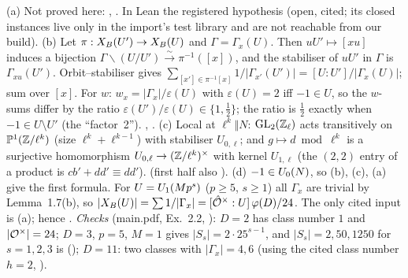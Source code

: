 \begin{outline}
(a) Not proved here: \stcited{} \cite[Thm.~25.1.1]{Vo}, \cite[\S4]{Eic55}. In Lean the registered hypothesis 
(open, cited; its closed instances live only in the import's test library and are not reachable from our build).
(b) Let $\pi:X_B(U')\to X_B(U)$ and $\Gamma=\Gamma_x(U)$. Then $uU'\mapsto[xu]$ induces a bijection $\Gamma\backslash(U/U')\xrightarrow\sim\pi^{-1}([x])$,
and the stabiliser of $uU'$ in $\Gamma$ is $\Gamma_{xu}(U')$. Orbit--stabiliser gives
$\sum_{[x']\in\pi^{-1}[x]}1/|\Gamma_{x'}(U')|=[U:U']/|\Gamma_x(U)|$; sum over $[x]$. For $w$: $w_x=|\Gamma_x|/\varepsilon(U)$ with
$\varepsilon(U)=2$ iff $-1\in U$, so the $w$-sums differ by the ratio $\varepsilon(U')/\varepsilon(U)\in\{1,\tfrac12\}$; the ratio is $\tfrac12$
exactly when $-1\in U\setminus U'$ (the ``factor~2''). \stproved, \stformal.
(c) Local at $\ell^k\Vert N$: $\mathrm{GL}_2(\mathbb{Z}_\ell)$ acts transitively on $\mathbb P^1(\mathbb{Z}/\ell^k)$ (size $\ell^k+\ell^{k-1}$) with stabiliser
$U_{0,\ell}$; and $g\mapsto d\bmod\ell^k$ is a surjective homomorphism $U_{0,\ell}\to(\mathbb{Z}/\ell^k)^\times$ with kernel $U_{1,\ell}$ (the $(2,2)$ entry of a
product is $cb'+dd'\equiv dd'$). \stproved{} (first half also \stformal).
(d) $-1\in U_0(N)$, so (b), (c), (a) give the first formula. For $U=U_1(Mp^s)$ ($p\ge5$, $s\ge1$) all $\Gamma_x$ are trivial by
Lemma~1.7(b), so $|X_B(U)|=\sum1/|\Gamma_x|=[\hat{\mathcal{O}}^\times:U]\,\varphi(D)/24$. The only cited input is (a); hence \stpmc.
\emph{Checks} (main.pdf, Ex.~2.2, \stpmc): $D=2$ has class number $1$ and $|\mathcal{O}^\times|=24$; $D=3$, $p=5$, $M=1$ gives $|S_s|=2\cdot25^{s-1}$,
and $|S_s|=2,50,1250$ for $s=1,2,3$ is \stcomp{} (); $D=11$: two classes with $|\Gamma_x|=4,6$ (using the cited
class number $h=2$, \cite[Thm.~30.1.5]{Vo}).
\end{outline}

